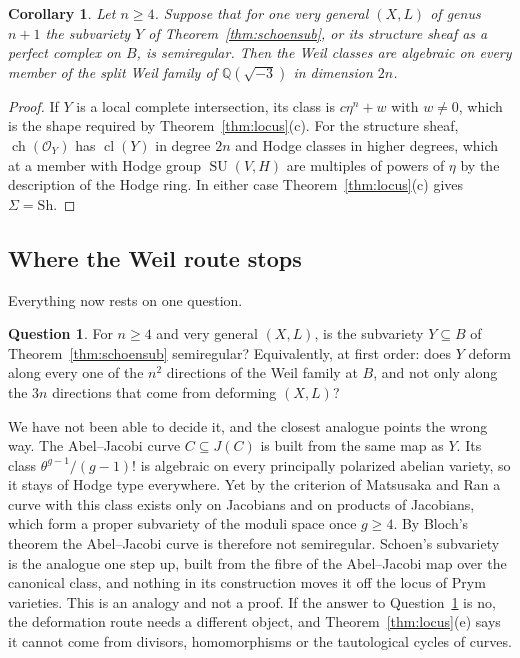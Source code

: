 \documentclass[11pt]{amsart}
\newtheorem{corollary}[theorem]{Corollary}
\theoremstyle{definition}
\newtheorem{question}[theorem]{Question}
\theoremstyle{remark}
\newcommand{\QQ}{\mathbb{Q}}
\newcommand{\cO}{\mathcal{O}}
\newcommand{\SU}{\operatorname{SU}}
\newcommand{\cl}{\operatorname{cl}}
\newcommand{\ch}{\operatorname{ch}}
\newcommand{\Sh}{\mathrm{Sh}}
\begin{document}
\begin{corollary}\label{cor:schoensemireg}
Let $n\ge4$. Suppose that for one very general $(X,L)$ of genus $n+1$ the
subvariety $Y$ of Theorem~\ref{thm:schoensub}, or its structure sheaf as a
perfect complex on $B$, is semiregular. Then the Weil classes are algebraic on
every member of the split Weil family of $\QQ(\sqrt{-3})$ in dimension $2n$.
\end{corollary}

\begin{proof}
If $Y$ is a local complete intersection, its class is
$c\eta^{n}+w$ with $w\ne0$, which is the shape required by
Theorem~\ref{thm:locus}(c). For the structure sheaf, $\ch(\cO_{Y})$ has
$\cl(Y)$ in degree $2n$ and Hodge classes in higher degrees, which at a
member with Hodge group $\SU(V,H)$ are multiples of powers of $\eta$ by the
description of the Hodge ring. In either case Theorem~\ref{thm:locus}(c)
gives $\Sigma=\Sh$.
\end{proof}

\subsection{Where the Weil route stops}

Everything now rests on one question.

\begin{question}\label{q:schoen}
For $n\ge4$ and very general $(X,L)$, is the subvariety $Y\subseteq B$ of
Theorem~\ref{thm:schoensub} semiregular? Equivalently, at first order:
does $Y$ deform along every one of the $n^{2}$ directions of the Weil family
at $B$, and not only along the $3n$ directions that come from deforming
$(X,L)$?
\end{question}

We have not been able to decide it, and the closest analogue points the wrong
way. The Abel--Jacobi curve $C\subseteq J(C)$ is built from the same map as
$Y$. Its class $\theta^{g-1}/(g-1)!$ is algebraic on every principally
polarized abelian variety, so it stays of Hodge type everywhere. Yet by the
criterion of Matsusaka and Ran \cite{Mat59,Ran81} a curve with this class
exists only on Jacobians and on products of Jacobians, which form a proper
subvariety of the moduli space once $g\ge4$. By Bloch's theorem
\cite{Blo72} the Abel--Jacobi curve is therefore not semiregular. Schoen's
subvariety is the analogue one step up, built from the fibre of the
Abel--Jacobi map over the canonical class, and nothing in its construction
moves it off the locus of Prym varieties. This is an analogy and not a proof.
If the answer to Question~\ref{q:schoen} is no, the deformation route needs
a different object, and Theorem~\ref{thm:locus}(e) says it cannot come from
divisors, homomorphisms or the tautological cycles of curves.
\end{document}

